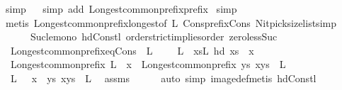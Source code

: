 \begin{isabellebody}
{\isacharparenleft}simp{\isacharparenright}\isanewline
\ \isamarkupfalse%
\ {\isacharparenleft}simp\ add{\isacharcolon}\ Longest{\isacharunderscore}common{\isacharunderscore}prefix{\isacharunderscore}prefix{\isacharparenright}\isanewline
{}\isamarkupfalse%
\ simp\isanewline
{}\isamarkupfalse%
{\isacharparenleft}metis\ Longest{\isacharunderscore}common{\isacharunderscore}prefix{\isacharunderscore}longest{\isacharbrackleft}of\ L{\isacharbrackright}\ Cons{\isacharunderscore}prefix{\isacharunderscore}Cons\ Nitpick{\isachardot}size{\isacharunderscore}list{\isacharunderscore}simp{\isacharparenleft}{}{\isacharparenright}\isanewline
\ \ \ \ \ Suc{\isacharunderscore}le{\isacharunderscore}mono\ hd{\isacharunderscore}Cons{\isacharunderscore}tl\ order{\isachardot}strict{\isacharunderscore}implies{\isacharunderscore}order\ zero{\isacharunderscore}less{\isacharunderscore}Suc{\isacharparenright}%
\endisatagproof
{\isafoldproof}%
%
\isadelimproof
\isanewline
%
\endisadelimproof
\isanewline
{}\isamarkupfalse%
\ Longest{\isacharunderscore}common{\isacharunderscore}prefix{\isacharunderscore}eq{\isacharunderscore}Cons{\isacharcolon}\ \ {\isachardoublequoteopen}L\ {\isasymnoteq}\ {\isacharbraceleft}{\isacharbraceright}{\isachardoublequoteclose}\ {\isachardoublequoteopen}{\isacharbrackleft}{\isacharbrackright}\ {\isasymnotin}\ L{\isachardoublequoteclose}\ \ {\isachardoublequoteopen}{\isasymforall}xs{\isasymin}L{\isachardot}\ hd\ xs\ {\isacharequal}\ x{\isachardoublequoteclose}\isanewline
{}\ {\isachardoublequoteopen}Longest{\isacharunderscore}common{\isacharunderscore}prefix\ L\ {\isacharequal}\ x\ {\isacharhash}\ Longest{\isacharunderscore}common{\isacharunderscore}prefix\ {\isacharbraceleft}ys{\isachardot}\ x{\isacharhash}ys\ {\isasymin}\ L{\isacharbraceright}{\isachardoublequoteclose}\isanewline
%
\isadelimproof
%
\endisadelimproof
%
\isatagproof
{}\isamarkupfalse%
\ {\isacharminus}\isanewline
\ \ \isamarkupfalse%
\ {\isachardoublequoteopen}L\ {\isacharequal}\ {\isacharparenleft}{\isacharhash}{\isacharparenright}\ x\ {\isacharbackquote}\ {\isacharbraceleft}ys{\isachardot}\ x{\isacharhash}ys\ {\isasymin}\ L{\isacharbraceright}{\isachardoublequoteclose}\ \isamarkupfalse%
\ assms{\isacharparenleft}{}{\isacharcomma}{}{\isacharparenright}\isanewline
\ \ \ \ \isamarkupfalse%
\ {\isacharparenleft}auto\ simp{\isacharcolon}\ image{\isacharunderscore}def{\isacharparenright}{\isacharparenleft}metis\ hd{\isacharunderscore}Cons{\isacharunderscore}tl{\isacharparenright}\isanewline

\end{isabellebody}
